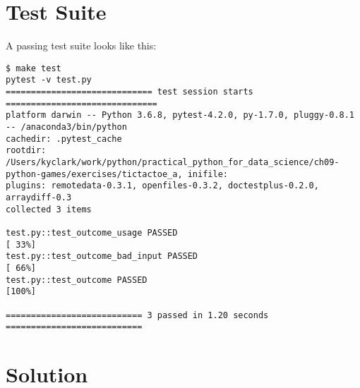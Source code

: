 \documentclass[]{article}
\begin{document}
\hypertarget{test-suite}{%
\section{Test Suite}\label{test-suite}}

A passing test suite looks like this:

\begin{verbatim}
$ make test
pytest -v test.py
============================= test session starts ==============================
platform darwin -- Python 3.6.8, pytest-4.2.0, py-1.7.0, pluggy-0.8.1 -- /anaconda3/bin/python
cachedir: .pytest_cache
rootdir: /Users/kyclark/work/python/practical_python_for_data_science/ch09-python-games/exercises/tictactoe_a, inifile:
plugins: remotedata-0.3.1, openfiles-0.3.2, doctestplus-0.2.0, arraydiff-0.3
collected 3 items

test.py::test_outcome_usage PASSED                                       [ 33%]
test.py::test_outcome_bad_input PASSED                                   [ 66%]
test.py::test_outcome PASSED                                             [100%]

=========================== 3 passed in 1.20 seconds ===========================
\end{verbatim}

\pagebreak

\hypertarget{solution-19}{%
\section{Solution}\label{solution-19}}
\end{document}
